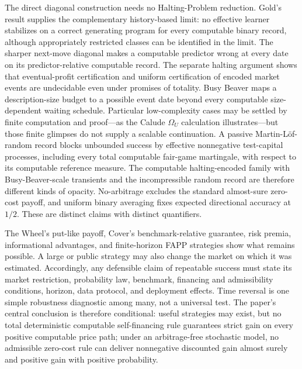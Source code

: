 \documentclass[aps,pra,reprint,superscriptaddress,amsmath,amssymb,floatfix]{revtex4-2}
\theoremstyle{plain}
\theoremstyle{definition}
\theoremstyle{remark}
\begin{document}
The direct diagonal construction needs no Halting-Problem reduction. Gold's
result supplies the complementary history-based limit: no effective
learner stabilizes on a correct generating program for every computable binary
record, although appropriately restricted classes can be identified in the
limit. The sharper next-move diagonal makes a computable predictor wrong at
every date on its predictor-relative computable record. The separate halting
argument shows that eventual-profit certification and uniform certification of
encoded market events are undecidable even under promises of totality.
Busy Beaver maps a description-size budget to a possible event date beyond
every computable size-dependent waiting schedule. Particular low-complexity
cases may be settled by finite computation and proof---as the Calude
\(\Omega_U\) calculation illustrates---but those finite glimpses do not supply
a scalable continuation. A passive Martin-L\"of-random record blocks unbounded
success by effective nonnegative test-capital processes, including every total
computable fair-game martingale, with respect to its computable reference
measure. The computable halting-encoded family with Busy-Beaver-scale
transients and the incompressible random record are therefore different kinds
of opacity. No-arbitrage excludes the standard almost-sure zero-cost payoff,
and uniform binary averaging fixes expected directional accuracy at \(1/2\).
These are distinct claims with distinct quantifiers.

The Wheel's put-like payoff, Cover's benchmark-relative guarantee, risk
premia, informational advantages, and finite-horizon FAPP strategies show what
remains possible. A large or public strategy may also change the market on
which it was estimated. Accordingly, any defensible claim of repeatable
success must state its market restriction, probability law, benchmark,
financing and admissibility conditions, horizon, data protocol, and deployment
effects. Time reversal is one simple robustness diagnostic among many, not a
universal test. The paper's central conclusion is therefore conditional:
useful strategies may exist, but no total deterministic computable
self-financing rule guarantees strict gain on every positive computable price
path; under an arbitrage-free stochastic model, no admissible zero-cost rule
can deliver nonnegative discounted gain almost surely and positive gain with
positive probability.
\end{document}
